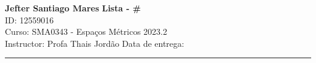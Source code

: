 \documentclass[a4paper, 11pt]{article}
\begin{document}
\newenvironment{solution}
    {\textit{Solution:}}
    {}
\noindent
\large\textbf{Jefter Santiago Mares} \hfill \textbf{Lista - \#}   \\
ID: 12559016 \\
\normalsize Curso: SMA0343 - Espaços Métricos \hfill 2023.2 \\
Instructor: Profa Thais Jordão \hfill Data de entrega: \\
\noindent\rule{7in}{2.8pt}
\end{document}
